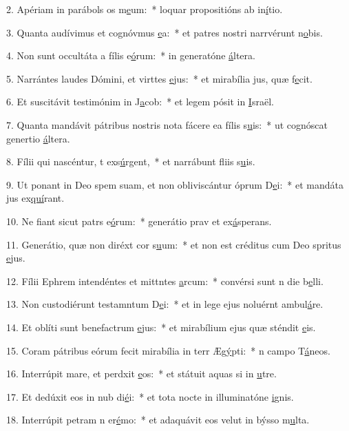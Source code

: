 2. Apériam in parábols os m\uline{e}um:~* loquar propositións ab in\uline{í}tio.\par 
3. Quanta audívimus et cognóvmus \uline{e}a:~* et patres nostri narrvérunt n\uline{o}bis.\par 
4. Non sunt occultáta a fílis e\uline{ó}rum:~* in generatóne \uline{á}ltera.\par 
5. Narrántes laudes Dómini, et virttes \uline{e}jus:~* et mirabília jus, quæ f\uline{e}cit.\par 
6. Et suscitávit testimónim in J\uline{a}cob:~* et legem pósit in \uline{I}sraël.\par 
7. Quanta mandávit pátribus nostris nota fácere ea fílis s\uline{u}is:~* ut cognóscat genertio \uline{á}ltera.\par 
8. Fílii qui nascéntur, t exs\uline{ú}rgent,~* et narrábunt fliis s\uline{u}is.\par 
9. Ut ponant in Deo spem suam, et non obliviscántur óprum D\uline{e}i:~* et mandáta jus ex\uline{quí}rant.\par 
10. Ne fiant sicut patrs e\uline{ó}rum:~* generátio prav et ex\uline{á}sperans.\par 
11. Generátio, quæ non diréxt cor s\uline{u}um:~* et non est créditus cum Deo spritus \uline{e}jus.\par 
12. Fílii Ephrem intendéntes et mittntes \uline{a}rcum:~* convérsi sunt n die b\uline{e}lli.\par 
13. Non custodiérunt testamntum D\uline{e}i:~* et in lege ejus noluérnt ambul\uline{á}re.\par 
14. Et oblíti sunt benefactrum \uline{e}jus:~* et mirabílium ejus quæ sténdit \uline{e}is.\par 
15. Coram pátribus eórum fecit mirabília in terr Æg\uline{ý}pti:~* n campo T\uline{á}neos.\par 
16. Interrúpit mare, et perdxit \uline{e}os:~* et státuit aquas si in \uline{u}tre.\par 
17. Et dedúxit eos in nub di\uline{é}i:~* et tota nocte in illuminatóne \uline{i}gnis.\par 
18. Interrúpit petram n er\uline{é}mo:~* et adaquávit eos velut in býsso m\uline{u}lta.\par 
